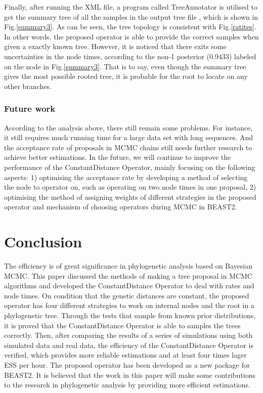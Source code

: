 \documentclass{bmcart}
\begin{document}
Finally, after running the XML file, a program called TreeAnnotator is utilised to get the summary tree of all the samples in the output tree file \cite{TreeAnnotator}, which is shown in Fig.\ref{summary3}. As can be seen, the tree topology is consistent with Fig.\ref{ratites}. In other words, the proposed operator is able to provide the correct samples when given a exactly known tree. However, it is noticed that there exits some uncertainties in the node times, according to the non-1 posterior (0.9433) labeled on the node in Fig.\ref{summary3}. That is to say, even though the summary tree gives the most possible rooted tree, it is probable for the root to locate on any other branches.

\subsubsection*{Future work}
According to the analysis above, there still remain some problems. For instance, it still requires much running time for a large data set with long sequences. And the acceptance rate of proposals in MCMC chains still needs further research to achieve better estimations. In the future, we will continue to improve the performance of the ConstantDistance Operator, mainly focusing on the following aspects: 1) optimising the acceptance rate by developing a method of selecting the node to operator on, such as operating on two node times in one proposal, 2) optimising the method of assigning weights of different strategies in the proposed operator and mechanism of choosing operators during MCMC in BEAST2.

\section*{Conclusion}
The efficiency is of great significance in phylogenetic analysis based on Bayesian MCMC. This paper discussed the methods of making a tree proposal in MCMC algorithms and developed the ConstantDistance Operator to deal with rates and node times. On condition that the genetic distances are constant, the proposed operator has four different strategies to work on internal nodes and the root in a phylogenetic tree. Through the tests that sample from known prior distributions, it is proved that the ConstantDistance Operator is able to samples the trees correctly. Then, after comparing the results of a series of simulations using both simulated data and real data, the efficiency of the ConstantDistance Operator is verified, which provides more reliable estimations and at least four times lager ESS per hour.  The proposed operator has been developed as a new package for BEAST2. It is believed that the work in this paper will make some contributions to the research in phylogenetic analysis by providing more efficient estimations.
\end{document}
